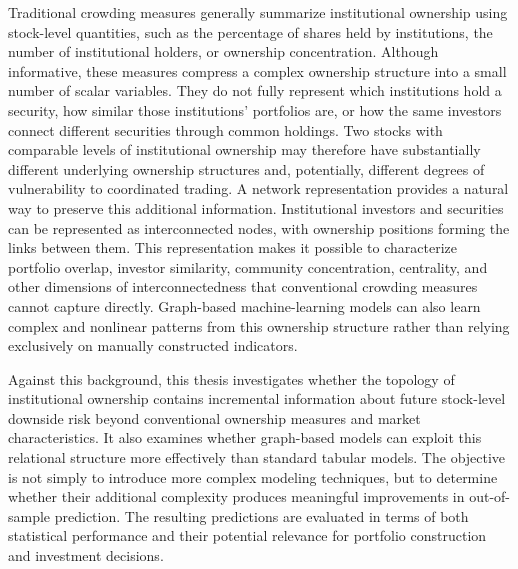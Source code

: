 Traditional crowding measures generally summarize institutional ownership using stock-level quantities, such as the percentage of shares held by institutions, the number of institutional holders, or ownership concentration. Although informative, these measures compress a complex ownership structure into a small number of scalar variables. They do not fully represent which institutions hold a security, how similar those institutions' portfolios are, or how the same investors connect different securities through common holdings. Two stocks with comparable levels of institutional ownership may therefore have substantially different underlying ownership structures and, potentially, different degrees of vulnerability to coordinated trading. A network representation provides a natural way to preserve this additional information. Institutional investors and securities can be represented as interconnected nodes, with ownership positions forming the links between them. This representation makes it possible to characterize portfolio overlap, investor similarity, community concentration, centrality, and other dimensions of interconnectedness that conventional crowding measures cannot capture directly. Graph-based machine-learning models can also learn complex and nonlinear patterns from this ownership structure rather than relying exclusively on manually constructed indicators.

Against this background, this thesis investigates whether the topology of institutional ownership contains incremental information about future stock-level downside risk beyond conventional ownership measures and market characteristics. It also examines whether graph-based models can exploit this relational structure more effectively than standard tabular models. The objective is not simply to introduce more complex modeling techniques, but to determine whether their additional complexity produces meaningful improvements in out-of-sample prediction. The resulting predictions are evaluated in terms of both statistical performance and their potential relevance for portfolio construction and investment decisions.